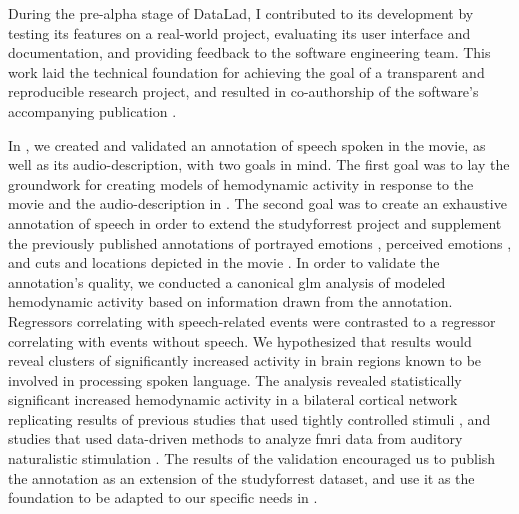 
During the pre-alpha stage of DataLad, I contributed to its development by
testing its features on a real-world project, evaluating its user interface and
documentation, and providing feedback to the software engineering team.
This work laid the technical foundation for achieving the goal of a transparent
and reproducible research project, and resulted in co-authorship of the
software's accompanying publication \citep[s.][]{halchenko2021datalad}.



In \citet{haeusler2021speechanno}, we created and validated an annotation of
speech spoken in the movie, as well as its audio-description, with two goals in
mind.
The first goal was to lay the groundwork for creating models of hemodynamic
activity in response to the movie and the audio-description in
\citet{haeusler2022processing}.
The second goal was to create an exhaustive annotation of speech in order to
extend the studyforrest project and supplement the previously published
annotations of portrayed emotions \citep{labs2015portrayed}, perceived emotions
\citep{lettieri2019emotionotopy}, and cuts and locations depicted in the movie
\citep{haeusler2016cutanno}.
In order to validate the annotation's quality, we conducted a canonical \ac{glm}
analysis of modeled hemodynamic activity based on information drawn from the
annotation.
Regressors correlating with speech-related events were contrasted to a regressor
correlating with events without speech.
We hypothesized that results would reveal clusters of significantly increased
activity in brain regions known to be involved in processing spoken language.
The analysis revealed statistically significant increased hemodynamic activity
in a bilateral cortical network replicating results of previous studies that
used tightly controlled stimuli \citep[s.][for reviews]{friederici2011brain,
hickok2007cortical,price2012twentyyears}, and studies that used data-driven
methods to analyze \ac{fmri} data from auditory naturalistic stimulation
\citep{honey2012not, lerner2011topographic, silbert2014coupled}.
The results of the validation encouraged us to publish the annotation as an
extension of the studyforrest dataset, and use it as the foundation to be
adapted to our specific needs in \citet{haeusler2022processing}.

